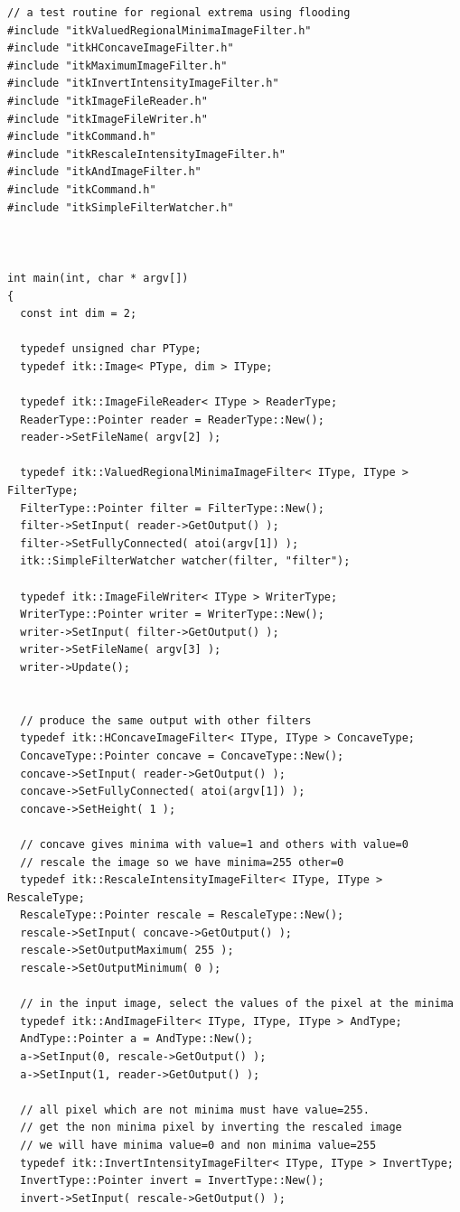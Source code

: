 \documentclass{InsightArticle}
\begin{document}
\small \begin{verbatim}
// a test routine for regional extrema using flooding
#include "itkValuedRegionalMinimaImageFilter.h"
#include "itkHConcaveImageFilter.h"
#include "itkMaximumImageFilter.h"
#include "itkInvertIntensityImageFilter.h"
#include "itkImageFileReader.h"
#include "itkImageFileWriter.h"
#include "itkCommand.h"
#include "itkRescaleIntensityImageFilter.h"
#include "itkAndImageFilter.h"
#include "itkCommand.h"
#include "itkSimpleFilterWatcher.h"



int main(int, char * argv[])
{
  const int dim = 2;
  
  typedef unsigned char PType;
  typedef itk::Image< PType, dim > IType;

  typedef itk::ImageFileReader< IType > ReaderType;
  ReaderType::Pointer reader = ReaderType::New();
  reader->SetFileName( argv[2] );

  typedef itk::ValuedRegionalMinimaImageFilter< IType, IType > FilterType;
  FilterType::Pointer filter = FilterType::New();
  filter->SetInput( reader->GetOutput() );
  filter->SetFullyConnected( atoi(argv[1]) );
  itk::SimpleFilterWatcher watcher(filter, "filter");

  typedef itk::ImageFileWriter< IType > WriterType;
  WriterType::Pointer writer = WriterType::New();
  writer->SetInput( filter->GetOutput() );
  writer->SetFileName( argv[3] );
  writer->Update();


  // produce the same output with other filters
  typedef itk::HConcaveImageFilter< IType, IType > ConcaveType;
  ConcaveType::Pointer concave = ConcaveType::New();
  concave->SetInput( reader->GetOutput() );
  concave->SetFullyConnected( atoi(argv[1]) );
  concave->SetHeight( 1 );

  // concave gives minima with value=1 and others with value=0
  // rescale the image so we have minima=255 other=0
  typedef itk::RescaleIntensityImageFilter< IType, IType > RescaleType;
  RescaleType::Pointer rescale = RescaleType::New();
  rescale->SetInput( concave->GetOutput() );
  rescale->SetOutputMaximum( 255 );
  rescale->SetOutputMinimum( 0 );

  // in the input image, select the values of the pixel at the minima
  typedef itk::AndImageFilter< IType, IType, IType > AndType;
  AndType::Pointer a = AndType::New();
  a->SetInput(0, rescale->GetOutput() );
  a->SetInput(1, reader->GetOutput() );

  // all pixel which are not minima must have value=255.
  // get the non minima pixel by inverting the rescaled image
  // we will have minima value=0 and non minima value=255
  typedef itk::InvertIntensityImageFilter< IType, IType > InvertType;
  InvertType::Pointer invert = InvertType::New();
  invert->SetInput( rescale->GetOutput() );


\end{verbatim}
\end{document}
